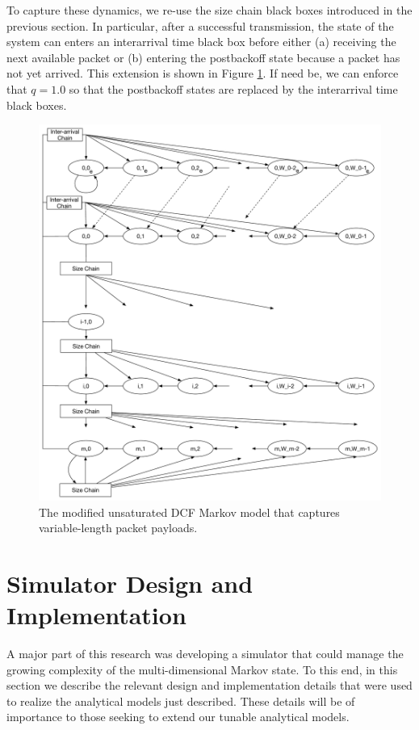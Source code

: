 \documentclass{llncs}
\begin{document}
To capture these dynamics, we re-use the size chain black boxes introduced in the previous section. In particular, after a successful transmission, the state of the system can enters an interarrival time black box before either (a) receiving the next available packet or (b) entering the postbackoff state because a packet has not yet arrived. This extension is shown in Figure \ref{fig:dcf_model_unsaturated_varpktsize_interarrival}. If need be, we can enforce that $q = 1.0$ so that the postbackoff states are replaced by the interarrival time black boxes. 

\begin{figure}
\begin{center}
\includegraphics[scale=0.35]{../../sketches/dcf_model_unsaturated_varpktsize_interarrival.pdf}
\caption{The modified unsaturated DCF Markov model that captures variable-length packet payloads.}
\label{fig:dcf_model_unsaturated_varpktsize_interarrival}
\end{center}
\end{figure}

\section{Simulator Design and Implementation}
A major part of this research was developing a simulator that could manage the growing complexity of the multi-dimensional Markov state. To this end, in this section we describe the relevant design and implementation details that were used to realize the analytical models just described. These details will be of importance to those seeking to extend our tunable analytical models. 
\end{document}
